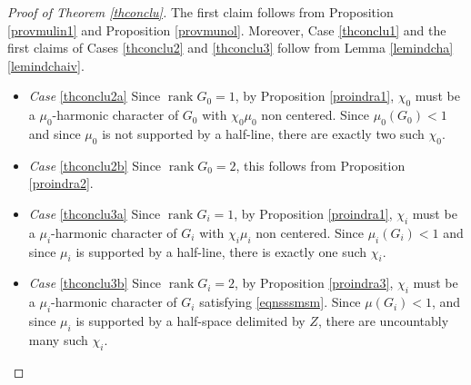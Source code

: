 \documentclass[11pt]{article}
\numberwithin{equation}{section}
\DeclareMathOperator{\rank}{rank}
\theoremstyle{definition}
\begin{document}
\begin{proof}[Proof of Theorem \ref{thconclu}]
The first claim follows from
Proposition \ref{provmulin1} and Proposition \ref{provmunol}. Moreover, Case \eqref{thconclu1}
and
the first claims of Cases \eqref{thconclu2} and \eqref{thconclu3} follow from Lemma \ref{lemindcha}\,\eqref{lemindchaiv}.
\begin{itemize}
\item
\emph{Case} \eqref{thconclu2a} Since $\rank G_0=1$,
by Proposition \ref{proindra1}, $\chi_0$ must be a $\mu_0$-harmonic character
of $G_0$ with $\chi_0\mu_0$ non centered.
Since $\mu_0(G_0)<1$ and since $\mu_0$ is not supported by a half-line,
there are exactly two such $\chi_0$.
\item
\emph{Case} \eqref{thconclu2b} Since $\rank G_0=2$, this follows from Proposition \ref{proindra2}.
\item
\emph{Case} \eqref{thconclu3a} Since $\rank G_i=1$,
by Proposition \ref{proindra1},
$\chi_i$ must be a $\mu_i$-harmonic character of $G_i$
with $\chi_i\mu_i$ non centered.
Since $\mu_i(G_i)<1$ and since $\mu_i$ is supported by a half-line,
there is exactly one such $\chi_i$.
\item
\emph{Case} \eqref{thconclu3b} Since $\rank G_i=2$,
by Proposition \ref{proindra3}, $\chi_i$
must be a $\mu_i$-harmonic character of $G_i$
satisfying \eqref{eqnsssmsm}.
Since $\mu(G_i)<1$, and since $\mu_i$ is supported
by a half-space delimited by $Z$,
there are uncountably many such $\chi_i$.\qedhere
\end{itemize}
\end{proof}
\end{document}
